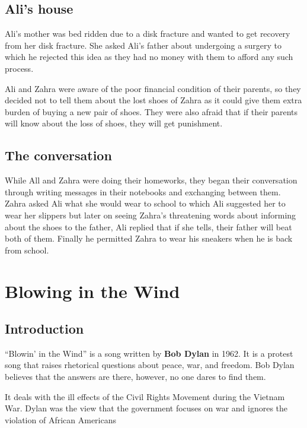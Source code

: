 \documentclass[a4paper,12pt]{book}
\begin{document}
\section{Ali’s house}
\label{sec:org8143f17}

Ali’s mother was bed ridden due to a disk fracture and wanted to get recovery from her disk fracture. She asked Ali’s father about undergoing a surgery to which he rejected this idea as they had no money with them to afford any such process.

Ali and Zahra were aware of the poor financial condition of their parents, so they decided not to tell them about the lost shoes of Zahra as it could give them extra burden of buying a new pair of shoes. They were also afraid that if their parents will know about the loss of shoes, they will get punishment.

\section{The conversation}
\label{sec:org621c2f5}

While All and Zahra were doing their homeworks, they began their conversation through writing messages in their notebooks and exchanging between them. Zahra asked Ali what she would wear to school to which Ali suggested her to wear her slippers but later on seeing Zahra’s threatening words about informing about the shoes to the father, Ali replied that if she tells, their father will beat both of them. Finally he permitted Zahra to wear his sneakers when he is back from school.

\chapter{Blowing in the Wind}
\label{sec:orgda2dc03}

\section{Introduction}
\label{sec:orgac46c74}

“Blowin’ in the Wind” is a song written by \textbf{Bob Dylan} in 1962. It is a protest song that raises rhetorical questions about peace, war, and freedom. Bob Dylan believes that the answers are there, however, no one dares to find them.

It deals with the ill effects of the Civil Rights Movement during the Vietnam War. Dylan was the view that the government focuses on war and ignores the violation of African Americans
\end{document}

